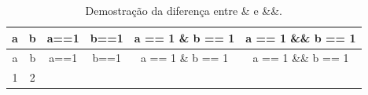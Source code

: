 \documentclass[]{book}
\begin{document}
\begin{longtable}[]{@{}cccccc@{}}
\caption{Demostração da diferença entre \& e \&\&.}\tabularnewline
\toprule
\begin{minipage}[b]{0.05\columnwidth}\centering\strut
a\strut
\end{minipage} & \begin{minipage}[b]{0.05\columnwidth}\centering\strut
b\strut
\end{minipage} & \begin{minipage}[b]{0.09\columnwidth}\centering\strut
a==1\strut
\end{minipage} & \begin{minipage}[b]{0.09\columnwidth}\centering\strut
b==1\strut
\end{minipage} & \begin{minipage}[b]{0.21\columnwidth}\centering\strut
a == 1 \& b == 1\strut
\end{minipage} & \begin{minipage}[b]{0.21\columnwidth}\centering\strut
a == 1 \&\& b == 1\strut
\end{minipage}\tabularnewline
\midrule
\endfirsthead
\toprule
\begin{minipage}[b]{0.05\columnwidth}\centering\strut
a\strut
\end{minipage} & \begin{minipage}[b]{0.05\columnwidth}\centering\strut
b\strut
\end{minipage} & \begin{minipage}[b]{0.09\columnwidth}\centering\strut
a==1\strut
\end{minipage} & \begin{minipage}[b]{0.09\columnwidth}\centering\strut
b==1\strut
\end{minipage} & \begin{minipage}[b]{0.21\columnwidth}\centering\strut
a == 1 \& b == 1\strut
\end{minipage} & \begin{minipage}[b]{0.21\columnwidth}\centering\strut
a == 1 \&\& b == 1\strut
\end{minipage}\tabularnewline
\midrule
\endhead
\begin{minipage}[t]{0.05\columnwidth}\centering\strut
1\strut
\end{minipage} & \begin{minipage}[t]{0.05\columnwidth}\centering\strut
2\strut
\end{minipage} & \begin{minipage}[t]{0.09\columnwidth}\centering\strut

\end{minipage}
\end{longtable}
\end{document}
